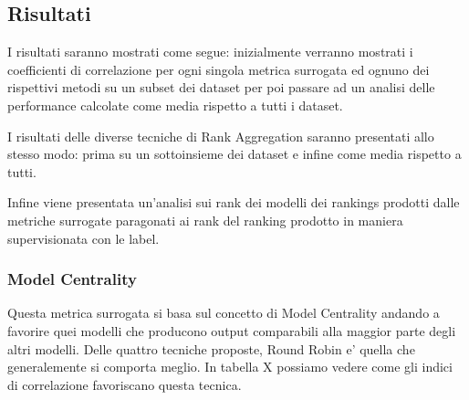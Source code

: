 \subsection{Risultati}
I risultati saranno mostrati come segue: inizialmente verranno mostrati i coefficienti di correlazione per ogni singola metrica surrogata ed ognuno dei rispettivi metodi su un subset dei dataset per poi passare ad un analisi delle performance calcolate come media rispetto a tutti i dataset.

I risultati delle diverse tecniche di Rank Aggregation saranno presentati allo stesso modo: prima su un sottoinsieme dei dataset e infine come media rispetto a tutti.

Infine viene presentata un'analisi sui rank dei modelli dei rankings prodotti dalle metriche surrogate paragonati ai rank del ranking prodotto in maniera supervisionata con le label.
\subsubsection{Model Centrality}
Questa metrica surrogata si basa sul concetto di Model Centrality andando a favorire quei modelli che producono output comparabili alla maggior parte degli altri modelli. Delle quattro tecniche proposte, Round Robin e' quella che generalemente si comporta meglio. In tabella X possiamo vedere come gli indici di correlazione favoriscano questa tecnica.




